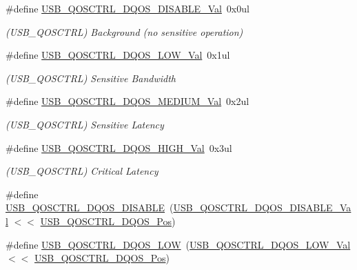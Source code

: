 \begin{DoxyCompactItemize}
\item 
\#define \mbox{\hyperlink{group___s_a_m_d21___u_s_b_ga3d0d46f938ac13917e1be9c9b7d80f8d}{U\+S\+B\+\_\+\+Q\+O\+S\+C\+T\+R\+L\+\_\+\+D\+Q\+O\+S\+\_\+\+D\+I\+S\+A\+B\+L\+E\+\_\+\+Val}}~0x0ul
\begin{DoxyCompactList}\small\item\em (U\+S\+B\+\_\+\+Q\+O\+S\+C\+T\+RL) Background (no sensitive operation) \end{DoxyCompactList}\item 
\#define \mbox{\hyperlink{group___s_a_m_d21___u_s_b_ga915608ba61e6d1cae101d141b9f9a84d}{U\+S\+B\+\_\+\+Q\+O\+S\+C\+T\+R\+L\+\_\+\+D\+Q\+O\+S\+\_\+\+L\+O\+W\+\_\+\+Val}}~0x1ul
\begin{DoxyCompactList}\small\item\em (U\+S\+B\+\_\+\+Q\+O\+S\+C\+T\+RL) Sensitive Bandwidth \end{DoxyCompactList}\item 
\#define \mbox{\hyperlink{group___s_a_m_d21___u_s_b_ga8cc229dafb3ee5657b7d26669744aa3f}{U\+S\+B\+\_\+\+Q\+O\+S\+C\+T\+R\+L\+\_\+\+D\+Q\+O\+S\+\_\+\+M\+E\+D\+I\+U\+M\+\_\+\+Val}}~0x2ul
\begin{DoxyCompactList}\small\item\em (U\+S\+B\+\_\+\+Q\+O\+S\+C\+T\+RL) Sensitive Latency \end{DoxyCompactList}\item 
\#define \mbox{\hyperlink{group___s_a_m_d21___u_s_b_ga732b6db263d6ce07f943ee607edad641}{U\+S\+B\+\_\+\+Q\+O\+S\+C\+T\+R\+L\+\_\+\+D\+Q\+O\+S\+\_\+\+H\+I\+G\+H\+\_\+\+Val}}~0x3ul
\begin{DoxyCompactList}\small\item\em (U\+S\+B\+\_\+\+Q\+O\+S\+C\+T\+RL) Critical Latency \end{DoxyCompactList}\item 
\#define \mbox{\hyperlink{group___s_a_m_d21___u_s_b_ga4a587f8bdc7ec0ba89ff5cf9f48fb88c}{U\+S\+B\+\_\+\+Q\+O\+S\+C\+T\+R\+L\+\_\+\+D\+Q\+O\+S\+\_\+\+D\+I\+S\+A\+B\+LE}}~(\mbox{\hyperlink{group___s_a_m_d21___u_s_b_ga3d0d46f938ac13917e1be9c9b7d80f8d}{U\+S\+B\+\_\+\+Q\+O\+S\+C\+T\+R\+L\+\_\+\+D\+Q\+O\+S\+\_\+\+D\+I\+S\+A\+B\+L\+E\+\_\+\+Val}}  $<$$<$ \mbox{\hyperlink{group___s_a_m_d21___u_s_b_gaaf8f4d2d3d077ae0f1c2dd8e7d950c98}{U\+S\+B\+\_\+\+Q\+O\+S\+C\+T\+R\+L\+\_\+\+D\+Q\+O\+S\+\_\+\+Pos}})
\item 
\#define \mbox{\hyperlink{group___s_a_m_d21___u_s_b_gaea719e372b2d9a52443b2bad0bb489f1}{U\+S\+B\+\_\+\+Q\+O\+S\+C\+T\+R\+L\+\_\+\+D\+Q\+O\+S\+\_\+\+L\+OW}}~(\mbox{\hyperlink{group___s_a_m_d21___u_s_b_ga915608ba61e6d1cae101d141b9f9a84d}{U\+S\+B\+\_\+\+Q\+O\+S\+C\+T\+R\+L\+\_\+\+D\+Q\+O\+S\+\_\+\+L\+O\+W\+\_\+\+Val}}      $<$$<$ \mbox{\hyperlink{group___s_a_m_d21___u_s_b_gaaf8f4d2d3d077ae0f1c2dd8e7d950c98}{U\+S\+B\+\_\+\+Q\+O\+S\+C\+T\+R\+L\+\_\+\+D\+Q\+O\+S\+\_\+\+Pos}})

\end{DoxyCompactItemize}
